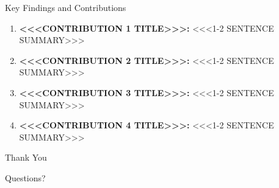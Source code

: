 \documentclass[aspectratio=169, 11pt]{beamer}
\begin{document}
\begin{frame}{Key Findings and Contributions}

\begin{enumerate}
  \item \textbf{<<<CONTRIBUTION 1 TITLE>>>:} <<<1-2 SENTENCE SUMMARY>>>

  \bigskip
  \item \textbf{<<<CONTRIBUTION 2 TITLE>>>:} <<<1-2 SENTENCE SUMMARY>>>

  \bigskip
  \item \textbf{<<<CONTRIBUTION 3 TITLE>>>:} <<<1-2 SENTENCE SUMMARY>>>

  \bigskip
  \item \textbf{<<<CONTRIBUTION 4 TITLE>>>:} <<<1-2 SENTENCE SUMMARY>>>
\end{enumerate}

\end{frame}


\begin{frame}{}
  \begin{center}
    {\Large Thank You}

    \bigskip
    {\normalsize Questions?}
  \end{center}
\end{frame}
\end{document}
